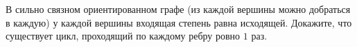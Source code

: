 В сильно связном ориентированном графе (из каждой вершины можно добраться в каждую) у каждой вершины
входящая степень равна исходящей. Докажите, что существует цикл, проходящий по каждому ребру ровно $1$
раз.
